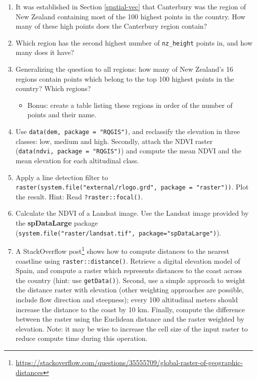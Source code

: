 \documentclass[]{krantz}
\providecommand{\tightlist}{%
  \setlength{\itemsep}{0pt}\setlength{\parskip}{0pt}}
\let\rmarkdownfootnote\footnote%
\def\footnote{\protect\rmarkdownfootnote}
\renewcommand{\href}[2]{#2\footnote{\url{#1}}}
\begin{document}
\begin{enumerate}
\def\labelenumi{\arabic{enumi}.}
\item
  It was established in Section \ref{spatial-vec} that Canterbury was the region of New Zealand containing most of the 100 highest points in the country.
  How many of these high points does the Canterbury region contain?
\item
  Which region has the second highest number of \texttt{nz\_height} points in, and how many does it have?
\item
  Generalizing the question to all regions: how many of New Zealand's 16 regions contain points which belong to the top 100 highest points in the country? Which regions?

  \begin{itemize}
  \tightlist
  \item
    Bonus: create a table listing these regions in order of the number of points and their name.
  \end{itemize}
\item
  Use \texttt{data(dem,\ package\ =\ "RQGIS")}, and reclassify the elevation in three classes: low, medium and high.
  Secondly, attach the NDVI raster (\texttt{data(ndvi,\ package\ =\ "RQGIS")}) and compute the mean NDVI and the mean elevation for each altitudinal class.
\item
  Apply a line detection filter to \texttt{raster(system.file("external/rlogo.grd",\ package\ =\ "raster"))}.
  Plot the result.
  Hint: Read \texttt{?raster::focal()}.
\item
  Calculate the NDVI of a Landsat image.
  Use the Landsat image provided by the \textbf{spDataLarge} package (\texttt{system.file("raster/landsat.tif",\ package="spDataLarge")}).
\item
  A StackOverflow \href{https://stackoverflow.com/questions/35555709/global-raster-of-geographic-distances}{post} shows how to compute distances to the nearest coastline using \texttt{raster::distance()}.
  Retrieve a digital elevation model of Spain, and compute a raster which represents distances to the coast across the country (hint: use \texttt{getData()}).
  Second, use a simple approach to weight the distance raster with elevation (other weighting approaches are possible, include flow direction and steepness); every 100 altitudinal meters should increase the distance to the coast by 10 km.
  Finally, compute the difference between the raster using the Euclidean distance and the raster weighted by elevation.
  Note: it may be wise to increase the cell size of the input raster to reduce compute time during this operation.
\end{enumerate}
\end{document}
